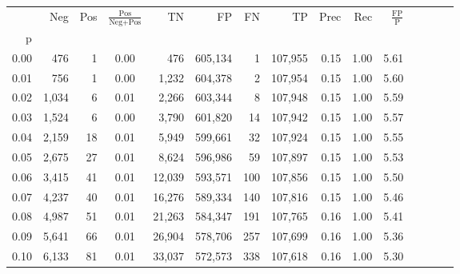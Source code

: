 \begin{tabular}{rrrcrrrrrrrrrrr}
\toprule
{} &     Neg &    Pos & $\frac{\text{Pos}}{\text{Neg}+\text{Pos}}$ &       TN &       FP &       FN &       TP &  Prec &   Rec & $\frac{\text{FP}}{\text{P}}$ \\
p    &         &        &                                            &          &          &          &          &       &       &                              \\
\midrule
0.00 &     476 &      1 &                                       0.00 &      476 &  605,134 &        1 &  107,955 &  0.15 &  1.00 &                         5.61 \\
0.01 &     756 &      1 &                                       0.00 &    1,232 &  604,378 &        2 &  107,954 &  0.15 &  1.00 &                         5.60 \\
0.02 &   1,034 &      6 &                                       0.01 &    2,266 &  603,344 &        8 &  107,948 &  0.15 &  1.00 &                         5.59 \\
0.03 &   1,524 &      6 &                                       0.00 &    3,790 &  601,820 &       14 &  107,942 &  0.15 &  1.00 &                         5.57 \\
0.04 &   2,159 &     18 &                                       0.01 &    5,949 &  599,661 &       32 &  107,924 &  0.15 &  1.00 &                         5.55 \\
0.05 &   2,675 &     27 &                                       0.01 &    8,624 &  596,986 &       59 &  107,897 &  0.15 &  1.00 &                         5.53 \\
0.06 &   3,415 &     41 &                                       0.01 &   12,039 &  593,571 &      100 &  107,856 &  0.15 &  1.00 &                         5.50 \\
0.07 &   4,237 &     40 &                                       0.01 &   16,276 &  589,334 &      140 &  107,816 &  0.15 &  1.00 &                         5.46 \\
0.08 &   4,987 &     51 &                                       0.01 &   21,263 &  584,347 &      191 &  107,765 &  0.16 &  1.00 &                         5.41 \\
0.09 &   5,641 &     66 &                                       0.01 &   26,904 &  578,706 &      257 &  107,699 &  0.16 &  1.00 &                         5.36 \\
0.10 &   6,133 &     81 &                                       0.01 &   33,037 &  572,573 &      338 &  107,618 &  0.16 &  1.00 &                         5.30 \\

\end{tabular}
